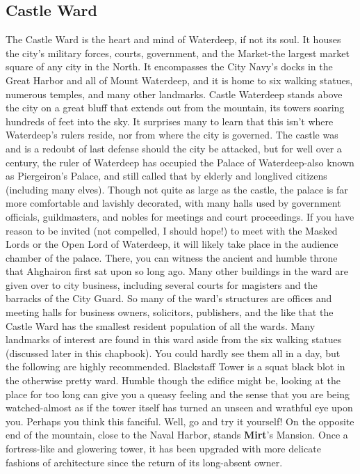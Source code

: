 \documentclass[10pt,a4paper,twoside,twocolumn,openany,nodeprecatedcode]{dndbook}
\begin{document}
\subsection{Castle Ward}
The Castle Ward is the heart and mind of Waterdeep, if not its soul. It houses the city's military forces, courts, government, and the Market-the largest market square of any city in the North. It encompasses the City Navy's docks in the Great Harbor and all of Mount Waterdeep, and it is home to six walking statues, numerous temples, and many other landmarks.
Castle Waterdeep stands above the city on a great bluff that extends out from the mountain, its towers soaring hundreds of feet into the sky. It surprises many to learn that this isn't where Waterdeep's rulers reside, nor from where the city is governed. The castle was and is a redoubt of last defense should the city be attacked, but for well over a century, the ruler of Waterdeep has occupied the Palace of Waterdeep-also known as Piergeiron's Palace, and still called that by elderly and longlived citizens (including many elves).
Though not quite as large as the castle, the palace is far more comfortable and lavishly decorated, with many halls used by government officials, guildmasters, and nobles for meetings and court proceedings. If you have reason to be invited (not compelled, I should hope!) to meet with the Masked Lords or the Open Lord of Waterdeep, it will likely take place in the audience chamber of the palace. There, you can witness the ancient and humble throne that Ahghairon first sat upon so long ago.
Many other buildings in the ward are given over to city business, including several courts for magisters and the barracks of the City Guard. So many of the ward's structures are offices and meeting halls for business owners, solicitors, publishers, and the like that the Castle Ward has the smallest resident population of all the wards.
Many landmarks of interest are found in this ward aside from the six walking statues (discussed later in this chapbook). You could hardly see them all in a day, but the following are highly recommended.
Blackstaff Tower is a squat black blot in the otherwise pretty ward. Humble though the edifice might be, looking at the place for too long can give you a queasy feeling and the sense that you are being watched-almost as if the tower itself has turned an unseen and wrathful eye upon you. Perhaps you think this fanciful. Well, go and try it yourself!
On the opposite end of the mountain, close to the Naval Harbor, stands \textbf{Mirt}'s Mansion. Once a fortress-like and glowering tower, it has been upgraded with more delicate fashions of architecture since the return of its long-absent owner.
\end{document}

